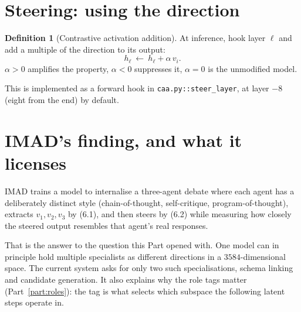 \documentclass[11pt]{article}
\theoremstyle{definition}
\newtheorem{definition}[theorem]{Definition}
\begin{document}
\section{Steering: using the direction}

\begin{definition}[Contrastive activation addition]
At inference, hook layer $\ell$ and add a multiple of the direction to its output:
\[
h_\ell \ \longleftarrow\ h_\ell + \alpha\,v_i .
\tag{6.2}
\]
$\alpha > 0$ amplifies the property, $\alpha < 0$ suppresses it, $\alpha=0$ is the unmodified model.
\end{definition}

This is implemented as a forward hook in \texttt{caa.py::steer\_layer}, at layer $-8$ (eight from the end) by default.

\section{IMAD's finding, and what it licenses}

IMAD trains a model to internalise a three-agent debate where each agent has a deliberately distinct style (chain-of-thought, self-critique, program-of-thought), extracts $v_1, v_2, v_3$ by (6.1), and then steers by (6.2) while measuring how closely the steered output resembles that agent's real responses.

\begin{center}
\end{center}

\begin{center}
\end{center}

That is the answer to the question this Part opened with. One model can in principle hold multiple specialists as different directions in a $3584$-dimensional space. The current system asks for only two such specialisations, schema linking and candidate generation. It also explains why the role tags matter (Part~\ref{part:roles}): the tag is what selects which subspace the following latent steps operate in.
\end{document}
